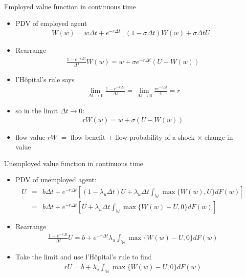 \documentclass[9pt]{beamer}
\newcommand{\bit}{\begin{itemize}}
\newcommand{\eit}{\end{itemize}}
\begin{document}
\begin{frame}{Employed value function in continuous time}

\bit
\setlength\itemsep{1.5em}

\item PDV of employed agent
\begin{eqnarray}
W(w) = w \Delta t + e^{-r \Delta t} \left[(1-\sigma  \Delta t )W(w) + \sigma  \Delta t  U \right]\nonumber
\end{eqnarray}
\item Rearrange
\begin{eqnarray}
\frac{1-e^{-r \Delta t}}{\Delta t}W(w) = w + \sigma e^{-r \Delta t}(U-W(w))\nonumber
\end{eqnarray}
\item l'H\^{o}pital's rule says
\begin{eqnarray}
\lim\limits_{\Delta t \rightarrow 0}\frac{1-e^{-r \Delta t}}{\Delta t} = \lim\limits_{\Delta t \rightarrow 0}\frac{re^{-r \Delta t}}{1} = r \nonumber
\end{eqnarray}
\item so in the limit $\Delta t \rightarrow 0$:
\begin{eqnarray}
r W(w) = w + \sigma (U-W(w)) \nonumber
\end{eqnarray}

\item flow value $rW$ $=$ flow benefit $+$ flow probability of a shock $\times$ change in value

\eit


\end{frame}

\begin{frame}{Unemployed value function in continuous time}

\bit
\setlength\itemsep{1.5em}
\item PDV of unemployed agent:
\begin{eqnarray}
U &=& b \Delta t + e^{-r \Delta t} \left[(1-\lambda_u \Delta t ) U + \lambda_u \Delta t \int_{\mathds{W}} \max\{W(w), U\} dF(w)\right] \nonumber \\
&=& b \Delta t + e^{-r \Delta t} \left[U + \lambda_u \Delta t \int_{\mathds{W}} \max\{W(w)-U, 0\} dF(w)\right] \nonumber
\end{eqnarray}
\item Rearrange
\begin{eqnarray}
\frac{1-e^{-r \Delta t}}{\Delta t}U = b  + e^{-r \Delta t} \lambda_u  \int_{\mathds{W}} \max\{W(w)-U, 0\} dF(w) \nonumber
\end{eqnarray}
\item Take the limit and use l'H\^{o}pital's rule to find 
\begin{eqnarray}
rU  = b + \lambda_u  \int_{\mathds{W}} \max\{W(w)-U, 0\} dF(w) \nonumber
\end{eqnarray}

\eit
\end{frame}
\end{document}
